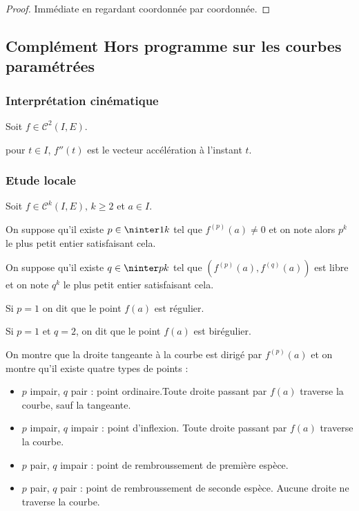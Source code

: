 \begin{proof}
    Immédiate en regardant coordonnée par coordonnée.
\end{proof}

\subsection{Complément Hors programme sur les courbes paramétrées}

\subsubsection{Interprétation cinématique }

Soit $f \in \mathscr C^2(I, E)$. 

pour $t \in I$, $f''(t)$ est le vecteur accélération à l'instant $t$.

\subsubsection{Etude locale }

Soit $f \in \mathscr C^k(I, E), \, k \geqslant 2$ et $a \in I$. 

On suppose qu'il existe $p \in \ninter 1 k$ tel que $f^{(p)}(a) \neq 0$ et
on note alors $p^k$ le plus petit entier satisfaisant cela. 

On suppose qu'il existe $q \in \ninter p k$ tel que $\left( f^{(p)}(a), f^{(q)}(a) \right)$ 
est libre et on note $q^k$ le plus petit entier satisfaisant cela.

Si $p = 1$ on dit que le point $f(a)$ est régulier. 

Si $p = 1$ et $q = 2$, on dit que le point $f(a)$ est birégulier. 

On montre que la droite tangeante à la courbe est dirigé par $f^{(p)}(a)$ et 
on montre qu'il existe quatre types de points : 

\begin{itemize}
    \item $p$ impair, $q$ pair : point ordinaire.Toute droite passant par $f(a)$ traverse la courbe, sauf la tangeante.
    \item $p$ impair, $q$ impair : point d'inflexion. Toute droite passant par $f(a)$ traverse la courbe. 
    \item $p$ pair, $q$ impair : point de rembroussement de première espèce. 
    \item $p$ pair, $q$ pair : point de rembroussement de seconde espèce. Aucune droite ne traverse la courbe.
\end{itemize}

